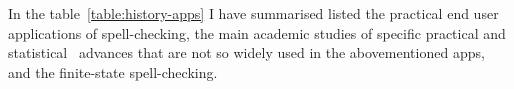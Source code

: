 \documentclass[officiallayout,draft]{unihelcompling}
\begin{document}

In the table~\ref{table:history-apps} I have summarised listed the practical
end user applications of spell-checking, the main academic studies of specific
practical and statistical~\cite{al2006learning} advances that are not so widely
used in the abovementioned apps, and the finite-state spell-checking.
\end{document}
